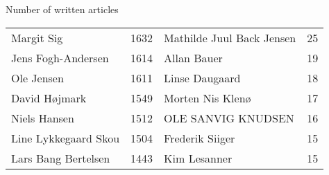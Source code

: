 \begin{frame}{\insertsection}{\insertsubsection}
\begin{block}{Number of written articles}
\begin{table}
{\begin{tabular}{l|c|l|c}
				Margit Sig           &  1632  & Mathilde Juul Back Jensen    &   25   \\
				Jens Fogh-Andersen   &  1614  & Allan Bauer                  &   19   \\
				Ole Jensen           &  1611  & Linse Daugaard               &   18   \\
				David Højmark        &  1549  & Morten Nis Klenø             &   17   \\
				Niels Hansen         &  1512  & OLE SANVIG KNUDSEN           &   16   \\
				Line Lykkegaard Skou &  1504  & Frederik Siiger              &   15   \\
				Lars Bang Bertelsen  &  1443  & Kim Lesanner                 &   15   \\
				\bottomrule
			\end{tabular}
			}
		\end{table}
	\end{block}
\end{frame}

